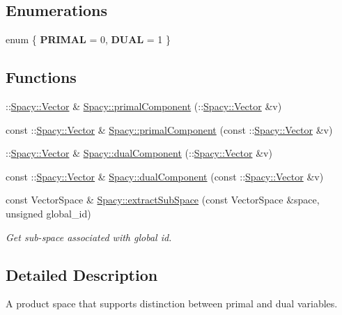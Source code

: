 \subsection*{\-Enumerations}
\begin{DoxyCompactItemize}
\item 
enum \{ {\bfseries \-P\-R\-I\-M\-A\-L} = 0, 
{\bfseries \-D\-U\-A\-L} = 1
 \}
\end{DoxyCompactItemize}
\subsection*{\-Functions}
\begin{DoxyCompactItemize}
\item 
\-::\hyperlink{classSpacy_1_1Vector}{\-Spacy\-::\-Vector} \& \hyperlink{group__ProductSpaceGroup_gaa040ba5c24284687e0df19c99dd688a6}{\-Spacy\-::primal\-Component} (\-::\hyperlink{classSpacy_1_1Vector}{\-Spacy\-::\-Vector} \&v)
\item 
const \-::\hyperlink{classSpacy_1_1Vector}{\-Spacy\-::\-Vector} \& \hyperlink{group__ProductSpaceGroup_ga88c5bcc74072f75c63ab7d9448f80a7e}{\-Spacy\-::primal\-Component} (const \-::\hyperlink{classSpacy_1_1Vector}{\-Spacy\-::\-Vector} \&v)
\item 
\-::\hyperlink{classSpacy_1_1Vector}{\-Spacy\-::\-Vector} \& \hyperlink{group__ProductSpaceGroup_gafe51c084e3b03205db94e91309e834f7}{\-Spacy\-::dual\-Component} (\-::\hyperlink{classSpacy_1_1Vector}{\-Spacy\-::\-Vector} \&v)
\item 
const \-::\hyperlink{classSpacy_1_1Vector}{\-Spacy\-::\-Vector} \& \hyperlink{group__ProductSpaceGroup_gabe5978657aab46b1575e2521b336407d}{\-Spacy\-::dual\-Component} (const \-::\hyperlink{classSpacy_1_1Vector}{\-Spacy\-::\-Vector} \&v)
\item 
\hypertarget{group__ProductSpaceGroup_ga6054e5c78652ac4959f5d521acadd86a}{const \-Vector\-Space \& \hyperlink{group__ProductSpaceGroup_ga6054e5c78652ac4959f5d521acadd86a}{\-Spacy\-::extract\-Sub\-Space} (const \-Vector\-Space \&space, unsigned global\-\_\-id)}\label{group__ProductSpaceGroup_ga6054e5c78652ac4959f5d521acadd86a}

\begin{DoxyCompactList}\small\item\em \-Get sub-\/space associated with global id. \end{DoxyCompactList}\end{DoxyCompactItemize}


\subsection{\-Detailed \-Description}
\-A product space that supports distinction between primal and dual variables. 

